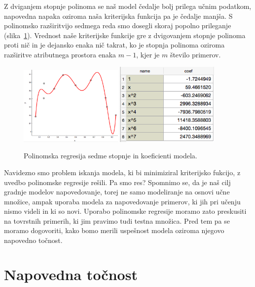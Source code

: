 Z dviganjem stopnje polinoma se naš model čedalje bolj prilega učnim podatkom, napovedna napaka oziroma naša kriterijska funkcija pa je čedalje manjša. S polinomsko razširitvijo sedmega reda smo dosegli skoraj popolno prileganje (slika~\ref{fig:poly-linear-fit7}). Vrednost naše kriterijske funkcije gre z dvigovanjem stopnje polinoma proti nič in je dejansko enaka nič takrat, ko je stopnja polinoma oziroma razširitve atributnega prostora enaka $m-1$, kjer je $m$ število primerov.

\begin{figure}[htbp]
\begin{center}
  \includegraphics[width=0.45\textwidth]{slike/poly-reg-7.png}
  \hfill
  \includegraphics[width=0.45\textwidth]{slike/poly-reg-7-coeff.png}
\caption{Polinomska regresija sedme stopnje in koeficienti modela.}
\label{fig:poly-linear-fit7}
\end{center}
\end{figure}

Navidezno smo problem iskanja modela, ki bi minimiziral kriterijsko fukcijo, z uvedbo polinomske regresije rešili. Pa smo res? Spomnimo se, da je naš cilj gradnje modelov napovedovanje, torej ne samo modeliranje na osnovi učne množice, ampak uporaba modela za napovedovanje primerov, ki jih pri učenju nismo videli in ki so novi. Uporabo polinomske regresije moramo zato preskusiti na tovrstnih primerih, ki jim pravimo tudi testna množica. Pred tem pa se moramo dogovoriti, kako bomo merili uspešnost modela oziroma njegovo napovedno točnost.

\section{Napovedna točnost}

